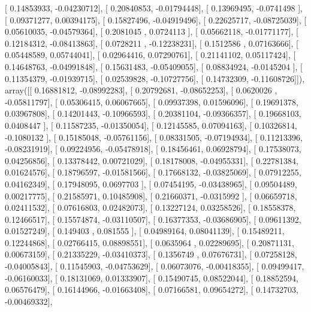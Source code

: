 \documentclass{article}
\begin{document}
       [ 0.14853933, -0.04230712],
       [ 0.20840853, -0.01794448],
       [ 0.13969495, -0.0741498 ],
       [ 0.09371277,  0.00394175],
       [ 0.15827496, -0.04919496],
       [ 0.22625717, -0.08725039],
       [ 0.05610035, -0.04579364],
       [ 0.2081045 ,  0.0724113 ],
       [ 0.05662118, -0.01771177],
       [ 0.12184312, -0.08413863],
       [ 0.0728211 , -0.12238231],
       [ 0.1512586 ,  0.07163666],
       [ 0.05448589,  0.05744041],
       [ 0.02964416,  0.07290761],
       [ 0.21141102,  0.05117424],
       [ 0.14648763, -0.04991848],
       [ 0.15631483, -0.05409055],
       [ 0.08834924, -0.0145204 ],
       [ 0.11354379, -0.01939715],
       [ 0.02539828, -0.10727756],
       [ 0.14732309, -0.11608726]]), array([[ 0.16881812, -0.08992283],
       [ 0.20792681, -0.08652253],
       [ 0.0620026 , -0.05811797],
       [ 0.05306415,  0.06067665],
       [ 0.09937398,  0.01596096],
       [ 0.19691378,  0.03967808],
       [ 0.14201443, -0.10966593],
       [ 0.20381104, -0.09366357],
       [ 0.19668103,  0.0408447 ],
       [ 0.11587235, -0.01350054],
       [ 0.12145585,  0.07094163],
       [ 0.10326814, -0.1080132 ],
       [ 0.15185048, -0.05761156],
       [ 0.08331505, -0.07194934],
       [ 0.11213396, -0.08231919],
       [ 0.09224956, -0.05478918],
       [ 0.18456461,  0.06928794],
       [ 0.17538073,  0.04256856],
       [ 0.13378442,  0.00721029],
       [ 0.18178008, -0.04955331],
       [ 0.22781384,  0.01624576],
       [ 0.18796597, -0.01581566],
       [ 0.17668132, -0.03825069],
       [ 0.07912255,  0.04162349],
       [ 0.17948095,  0.0697703 ],
       [ 0.07454195, -0.03438965],
       [ 0.09504489,  0.00217775],
       [ 0.21585971,  0.10485908],
       [ 0.21660371, -0.0315992 ],
       [ 0.06659718,  0.02411532],
       [ 0.07616803,  0.02482073],
       [ 0.13227124,  0.03258526],
       [ 0.18558378,  0.12466517],
       [ 0.15574874, -0.03110507],
       [ 0.16377353, -0.03686905],
       [ 0.09611392,  0.01527249],
       [ 0.149403  ,  0.081555  ],
       [ 0.04989164,  0.08041139],
       [ 0.15489211,  0.12244868],
       [ 0.02766415,  0.08898551],
       [ 0.0635964 ,  0.02289695],
       [ 0.20871131,  0.00673159],
       [ 0.21335229, -0.03410373],
       [ 0.1356749 ,  0.07676731],
       [ 0.07258128, -0.04005843],
       [ 0.11545903, -0.04753629],
       [ 0.06073076, -0.00418355],
       [ 0.09499417, -0.06160033],
       [ 0.18131069,  0.01333907],
       [ 0.15490745,  0.08522044],
       [ 0.18852594,  0.06576479],
       [ 0.16144966, -0.01663408],
       [ 0.07166581,  0.09654272],
       [ 0.14732703, -0.00469332],
\end{document}
